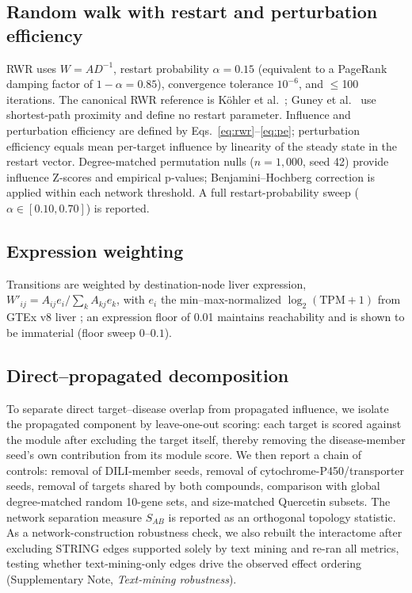 \subsection{Random walk with restart and perturbation efficiency}
RWR uses $W=AD^{-1}$, restart probability $\alpha=0.15$ (equivalent to a PageRank damping factor of $1-\alpha=0.85$), convergence tolerance $10^{-6}$, and $\leq$100 iterations. The canonical RWR reference is K\"ohler et al.\ \citep{Kohler2008}; Guney et al.\ \citep{Guney2016} use shortest-path proximity and define no restart parameter. Influence and perturbation efficiency are defined by Eqs.~\eqref{eq:rwr}--\eqref{eq:pe}; perturbation efficiency equals mean per-target influence by linearity of the steady state in the restart vector. Degree-matched permutation nulls ($n=1{,}000$, seed 42) provide influence Z-scores and empirical p-values; Benjamini--Hochberg correction is applied within each network threshold. A full restart-probability sweep ($\alpha\in[0.10,0.70]$) is reported.

\subsection{Expression weighting}
Transitions are weighted by destination-node liver expression, $W'_{ij} = A_{ij} e_i / \sum_k A_{kj} e_k$, with $e_i$ the min--max-normalized $\log_2(\mathrm{TPM}+1)$ from GTEx v8 liver \citep{GTEx2020}; an expression floor of 0.01 maintains reachability and is shown to be immaterial (floor sweep $0$--$0.1$).

\subsection{Direct--propagated decomposition}
To separate direct target--disease overlap from propagated influence, we isolate the propagated component by leave-one-out scoring: each target is scored against the module after excluding the target itself, thereby removing the disease-member seed's own contribution from its module score. We then report a chain of controls: removal of DILI-member seeds, removal of cytochrome-P450/transporter seeds, removal of targets shared by both compounds, comparison with global degree-matched random 10-gene sets, and size-matched Quercetin subsets. The network separation measure $S_{AB}$ \citep{Menche2015} is reported as an orthogonal topology statistic. As a network-construction robustness check, we also rebuilt the interactome after excluding STRING edges supported solely by text mining \citep{Huang2018} and re-ran all metrics, testing whether text-mining-only edges drive the observed effect ordering (Supplementary Note, \textit{Text-mining robustness}).

